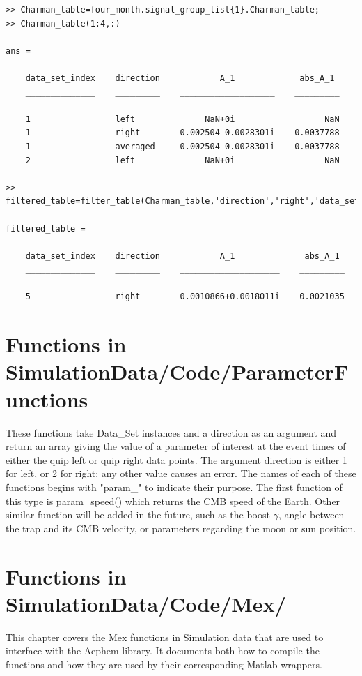 \documentclass[12pt]{report}
\begin{document}
\begin{verbatim}
>> Charman_table=four_month.signal_group_list{1}.Charman_table;
>> Charman_table(1:4,:)

ans = 

    data_set_index    direction            A_1             abs_A_1 
    ______________    _________    ___________________    _________

    1                 left              NaN+0i                  NaN
    1                 right        0.002504-0.0028301i    0.0037788
    1                 averaged     0.002504-0.0028301i    0.0037788
    2                 left              NaN+0i                  NaN

>> filtered_table=filter_table(Charman_table,'direction','right','data_set_index',5)

filtered_table = 

    data_set_index    direction            A_1              abs_A_1 
    ______________    _________    ____________________    _________

    5                 right        0.0010866+0.0018011i    0.0021035
\end{verbatim}





\chapter{Functions in SimulationData/Code/ParameterFunctions}
These functions take Data\_Set instances and a direction as an argument and return an array giving the value of a parameter of interest at the event times of either the quip left or quip right data points.  The argument direction is either 1 for left, or 2 for right; any other value causes an error.  The names of each of these functions begins with "param\_" to indicate their purpose.  The first function of this type is param\_speed() which returns the CMB speed of the Earth.  Other similar function will be added in the future, such as the boost $\gamma$, angle between the trap and its CMB velocity, or parameters regarding the moon or sun position.







\chapter{Functions in SimulationData/Code/Mex/}
\label{chap:Mex}
This chapter covers the Mex functions in Simulation data that are used to interface with the Aephem library.  It documents both how to compile the functions and how they are used by their corresponding Matlab wrappers.
\end{document}
